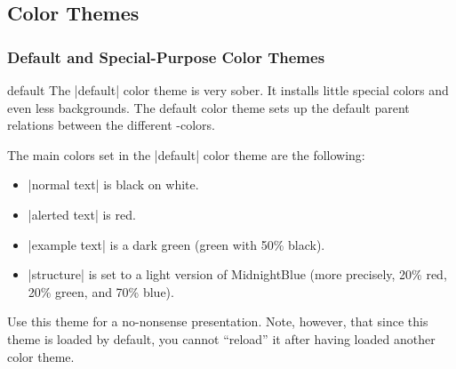 \subsection{Color Themes}

\subsubsection{Default and Special-Purpose Color Themes}

\begin{colorthemeexample}{default}
  The |default| color theme is very sober. It installs little special
  colors and even less backgrounds. The default color theme sets up
  the default parent relations between the different \beamer-colors.

  The main colors set in the |default| color theme are the following: 
  \begin{itemize}
  \item
    |normal text| is black on white.
  \item
    |alerted text| is red.
  \item
    |example text| is a dark green (green with 50\% black).
  \item
    |structure| is set to a light version of MidnightBlue
    (more precisely, 20\% red, 20\% green, and 70\% blue).  
  \end{itemize}
  Use this theme for a no-nonsense presentation. Note, however, that
  since this theme is loaded by default, you cannot ``reload'' it
  after having loaded another color theme.
\end{colorthemeexample}

